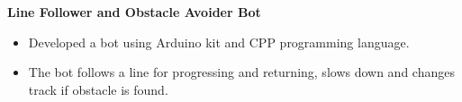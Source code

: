 \textbf{Line Follower and Obstacle Avoider Bot} \par
\begin{itemize}
	\item Developed a bot using Arduino kit and CPP programming language.
	\item The bot follows a line for progressing and returning, slows down and changes track if obstacle is found.
\end{itemize}\vspace{0.1cm}\par